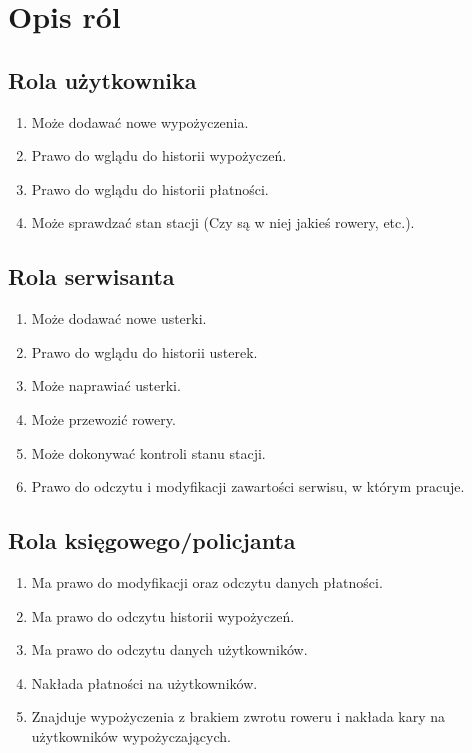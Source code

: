 \documentclass{article}
\begin{document}
\section{Opis ról}
\subsection{Rola użytkownika}
\begin{enumerate}
	\item Może dodawać nowe wypożyczenia.
	\item Prawo do wglądu do historii wypożyczeń.
	\item Prawo do wglądu do historii płatności.
	\item Może sprawdzać stan stacji (Czy są w niej jakieś rowery, etc.).
\end{enumerate}

\subsection{Rola serwisanta}
\begin{enumerate}
	\item Może dodawać nowe usterki.
	\item Prawo do wglądu do historii usterek.
	\item Może naprawiać usterki.
	\item Może przewozić rowery.
	\item Może dokonywać kontroli stanu stacji.
	\item Prawo do odczytu i modyfikacji zawartości serwisu, w którym pracuje.
\end{enumerate}

\subsection{Rola księgowego/policjanta}
\begin{enumerate}
	\item Ma prawo do modyfikacji oraz odczytu danych płatności.
	\item Ma prawo do odczytu historii wypożyczeń.
	\item Ma prawo do odczytu danych użytkowników.
	\item Nakłada płatności na użytkowników.
	\item Znajduje wypożyczenia z brakiem zwrotu roweru i nakłada kary na użytkowników wypożyczających.
\end{enumerate}
\end{document}
